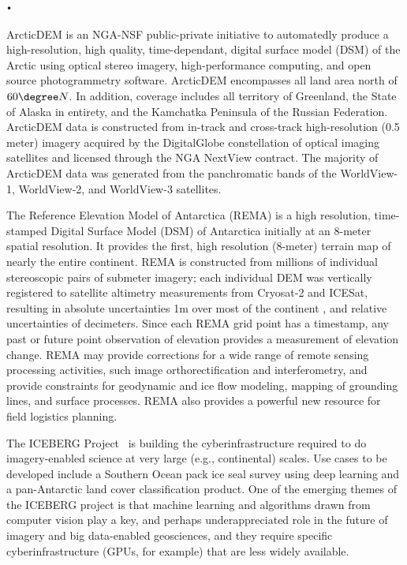 \texttt{•}\documentclass[10pt,letterpaper,draft]{article}
\begin{document}
\begin{description}[style=unboxed]
	
	\item [ArcticDEM:] ArcticDEM is an NGA-NSF public-private initiative to automatedly produce a high-resolution, high quality, time-dependant, digital surface model (DSM) of the Arctic using optical stereo imagery, high-performance computing, and open source photogrammetry software. ArcticDEM encompasses all land area north of $60\degree N$. In addition, coverage includes all territory of Greenland, the State of Alaska in entirety, and the Kamchatka Peninsula of the Russian Federation. ArcticDEM data is constructed from in-track and cross-track high-resolution (0.5 meter) imagery acquired by the DigitalGlobe constellation of optical imaging satellites and licensed through the NGA NextView contract. The majority of ArcticDEM data was generated from the panchromatic bands of the WorldView-1, WorldView-2, and WorldView-3 satellites. 
  
	\item [REMA:] The Reference Elevation Model of Antarctica (REMA) is a high resolution, time-stamped Digital Surface Model (DSM) of Antarctica initially at an 8-meter spatial resolution. It provides the first, high resolution (8-meter) terrain map of nearly the entire continent. REMA is constructed from millions of individual stereoscopic pairs of submeter imagery; each individual DEM was vertically registered to satellite altimetry measurements from Cryosat-2 and ICESat, resulting in absolute uncertainties   1m over most of the continent , and relative uncertainties of decimeters. Since each REMA grid point has a timestamp, any past or future point observation of elevation provides a measurement of elevation change. REMA may provide corrections for a wide range of remote sensing processing activities, such image orthorectification and interferometry, and provide constraints for geodynamic and ice flow modeling, mapping of grounding lines, and surface processes. REMA also provides a powerful new resource for field logistics planning.

	\item [ICEBERG: Imagery CI and Extensible Building-Blocks to Enhance Research in the Geosciences:] The ICEBERG Project~\cite{Hackathon} is building the cyberinfrastructure required to do imagery-enabled science at very large (e.g., continental) scales. Use cases to be developed include a Southern Ocean pack ice seal survey using deep learning and a pan-Antarctic land cover classification product. One of the emerging themes of the ICEBERG project is that machine learning and algorithms drawn from computer vision play a key, and perhaps underappreciated role in the future of imagery and big data-enabled geosciences, and they require specific cyberinfrastructure (GPUs, for example) that are less widely available.


\end{description}
\end{document}
